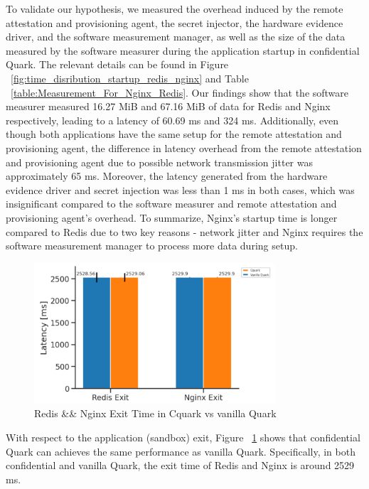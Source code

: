 To validate our hypothesis, we measured the overhead induced by the remote attestation and provisioning agent, the secret injector, the hardware evidence driver, and the software measurement manager, as well as the size of the data measured by the software measurer during the application 
startup in confidential Quark. The relevant details can be found in Figure  ~\ref{fig:time_disribution_startup_redis_nginx} and Table ~\ref{table:Measurement_For_Nginx_Redis}. Our findings show that the software measurer measured 16.27 MiB and 67.16 MiB of data for Redis and Nginx respectively, 
leading to a latency of 60.69 ms and 324 ms. Additionally, even though both applications have the same setup for the remote attestation and provisioning agent, the difference in latency overhead from the remote attestation and provisioning agent due to possible network transmission jitter 
was approximately 65 ms. Moreover, the latency generated from the hardware evidence driver and secret injection was less than 1 ms in both cases, which was insignificant compared to the software measurer and remote attestation and provisioning agent's overhead. To summarize, 
Nginx's startup time is longer compared to Redis due to two key reasons - network jitter and Nginx requires the software measurement manager to process more data during setup.

\begin{figure}[H]
    \centering
    \includegraphics[width=0.8\textwidth]{images/reds_nginx_exit_comp.PNG}
    \caption[Redis \&\& Nginx Exit Time in Cquark vs vanilla Quark]{Redis \&\& Nginx Exit Time in Cquark vs vanilla Quark}
    \label{fig:reds_nginx_exit_comp}
\end{figure}


With respect to the application (sandbox) exit, Figure ~\ref{fig:reds_nginx_exit_comp}  shows that confidential Quark can achieves the same performance as vanilla Quark. Specifically, in both confidential and vanilla Quark, the exit time of Redis and Nginx is around 2529 ms.

